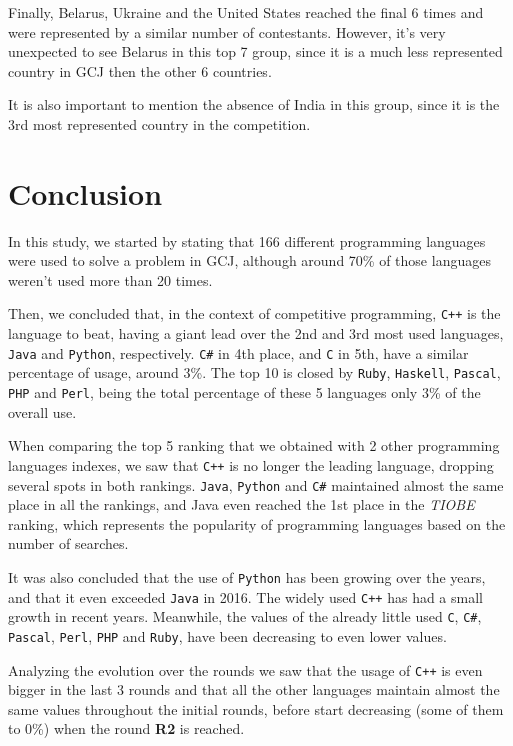 \documentclass{article}
\begin{document}
\begin{multicols*}{2}
Finally, Belarus, Ukraine and the United States reached the final 6 times and were represented by a similar number of contestants. However, it's very unexpected to see Belarus in this top 7 group, since it is a much less represented country in GCJ then the other 6 countries.

It is also important to mention the absence of India in this group, since it is the 3rd most represented country in the competition.

\section{Conclusion}

In this study, we started by stating that 166 different programming languages were used to solve a problem in GCJ, although around 70\% of those languages weren't used more than 20 times.

Then, we concluded that, in the context of competitive programming, \texttt{C++} is the language to beat, having a giant lead over the 2nd and 3rd most used languages, \texttt{Java} and \texttt{Python}, respectively. \texttt{C\#} in 4th place, and \texttt{C} in 5th, have a similar percentage of usage, around 3\%. The top 10 is closed by \texttt{Ruby}, \texttt{Haskell}, \texttt{Pascal}, \texttt{PHP} and \texttt{Perl}, being the total percentage of these 5 languages only 3\% of the overall use.

When comparing the top 5 ranking that we obtained with 2 other programming languages indexes, we saw that \texttt{C++} is no longer the leading language, dropping several spots in both rankings. \texttt{Java}, \texttt{Python} and \texttt{C\#} maintained almost the same place in all the rankings, and Java even reached the 1st place in the \textit{TIOBE} ranking, which represents the popularity of programming languages based on the number of searches.

It was also concluded that the use of \texttt{Python} has been growing over the years, and that it even exceeded \texttt{Java} in 2016. The widely used \texttt{C++} has had a small growth in recent years. Meanwhile, the values of the already little used \texttt{C}, \texttt{C\#}, \texttt{Pascal}, \texttt{Perl}, \texttt{PHP} and \texttt{Ruby}, have been decreasing to even lower values.

Analyzing the evolution over the rounds we saw that the usage of \texttt{C++} is even bigger in the last 3 rounds and that all the other languages maintain almost the same values throughout the initial rounds, before start decreasing (some of them to 0\%) when the round \textbf{R2} is reached.


\end{multicols*}
\end{document}
